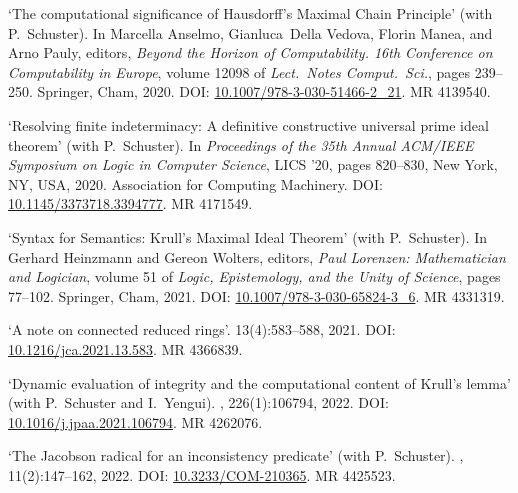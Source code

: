 \documentclass[a4paper]{article}
\begin{document}
\begin{flushleft}
\begin{thebibliography}{10}
\newblock `The computational significance of {H}ausdorff's {M}aximal {C}hain {P}rinciple' (with P.~Schuster).
\newblock In Marcella Anselmo, Gianluca~Della Vedova, Florin Manea, and Arno
  Pauly, editors, {\em Beyond the Horizon of Computability. 16th Conference on
  Computability in Europe}, volume 12098 of {\em Lect.~Notes Comput.~Sci.},
  pages 239--250. Springer, Cham, 2020.
\newblock DOI: \href{https://doi.org/10.1007/978-3-030-51466-2_21}{10.1007/978-3-030-51466-2\_21}.
\newblock MR 4139540.

\newblock `Resolving finite indeterminacy: A definitive constructive universal prime ideal theorem' (with P.~Schuster).
\newblock In {\em Proceedings of the 35th Annual ACM/IEEE Symposium on Logic in
  Computer Science}, LICS '20, pages 820--830, New York, NY, USA, 2020.
  Association for Computing Machinery.
\newblock DOI: \href{https://doi.org/10.1145/3373718.3394777}{10.1145/3373718.3394777}.
\newblock MR 4171549.

\newblock `Syntax for {S}emantics: {K}rull's {M}aximal {I}deal {T}heorem' (with P.~Schuster).
\newblock In Gerhard Heinzmann and Gereon Wolters, editors, {\em Paul Lorenzen:
  Mathematician and Logician}, volume 51 of {\em Logic, Epistemology, and the Unity of Science},
  pages 77--102. Springer, Cham, 2021.
\newblock DOI: \href{https://doi.org/10.1007/978-3-030-65824-3_6}{10.1007/978-3-030-65824-3\_6}.
\newblock MR 4331319.

\newblock `A note on connected reduced rings'.
 13(4):583--588, 2021.
\newblock DOI: \href{https://doi.org/10.1216/jca.2021.13.583}{10.1216/jca.2021.13.583}.
\newblock MR 4366839.

\newblock `Dynamic evaluation of integrity and the computational content of {K}rull's lemma' (with P.~Schuster and I.~Yengui).
, 226(1):106794, 2022.
\newblock DOI: \href{https://doi.org/10.1016/j.jpaa.2021.106794}{10.1016/j.jpaa.2021.106794}.
\newblock MR 4262076.

\newblock `The Jacobson radical for an inconsistency predicate' (with P.~Schuster).
, 11(2):147--162, 2022.
\newblock DOI: \href{https://doi.org/10.3233/COM-210365}{10.3233/COM-210365}.
\newblock MR 4425523.


\end{thebibliography}
\end{flushleft}
\end{document}
